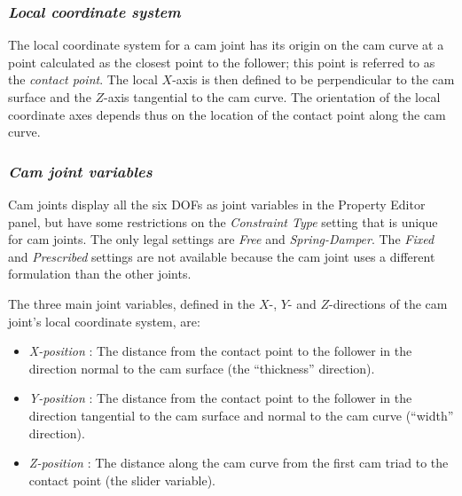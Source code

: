 \subsubsection{\sl\textbf{Local coordinate system}}

The local coordinate system for a cam joint has its origin on the cam
curve at a point calculated as the closest point to the follower; this
point is referred to as the {\sl contact point}. The local $X$-axis is
then defined to be perpendicular to the cam surface and the $Z$-axis
tangential to the cam curve. The orientation of the local coordinate
axes depends thus on the location of the contact point along the cam curve.

\subsubsection{\sl\textbf{Cam joint variables}}

Cam joints display all the six DOFs as joint variables in the Property
Editor panel, but have some restrictions on the {\sl Constraint Type}
setting that is unique for cam joints.
The only legal settings are {\sl Free} and {\sl Spring-Damper}.
The {\sl Fixed} and {\sl Prescribed} settings are not available because
the cam joint uses a different formulation than the other joints.

The three main joint variables, defined in the $X$-, $Y$- and $Z$-directions
of the cam joint's local coordinate system, are:

\begin{itemize}
\item{\sl X-position} :
  The distance from the contact point to the follower in the
  direction normal to the cam surface (the ``thickness'' direction).


\item{\sl Y-position} : The distance from the contact point to the follower
  in the direction tangential to the cam surface and normal to the cam curve
  (``width'' direction).

\item{\sl Z-position} : The distance along the cam curve from the first
  cam triad to the contact point (the slider variable).
\end{itemize}

